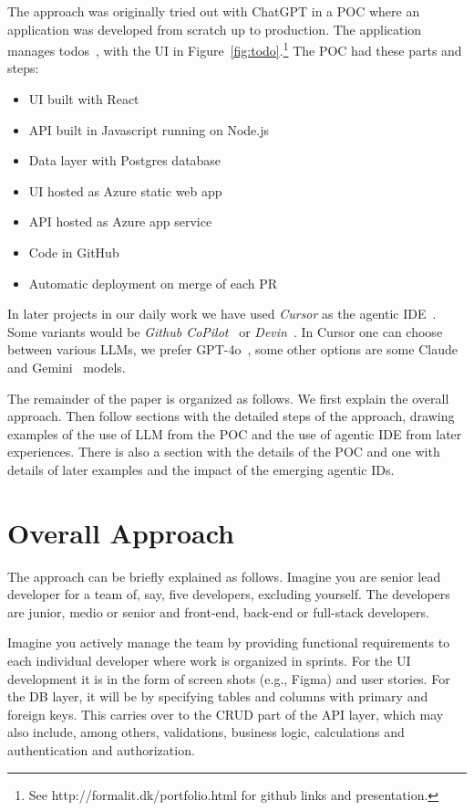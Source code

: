 \documentclass[runningheads]{llncs}
\begin{document}
\noindent The approach was originally tried out with ChatGPT in a POC where an application was developed from scratch up to production. The application manages todos~\cite{Freeman2013}, with the UI in Figure~\ref{fig:todo}.\footnote{See http://formalit.dk/portfolio.html for github links and presentation.}  The POC had these parts and steps:
\begin{itemize}
    \item UI built with React
    \item API built in Javascript running on Node.js
    \item Data layer with Postgres database
    \item UI hosted as Azure static web app
    \item API hosted as Azure app service
    \item Code in GitHub
    \item Automatic deployment on merge of each PR
\end{itemize}

\noindent In later projects in our daily work we have used {\em Cursor} as the agentic IDE~\cite{Cursor2023}. Some variants would be {\em Github CoPilot}~\cite{GitHubCopilot2023} or {\em Devin}~\cite{Devin2023}. In Cursor one can choose between various LLMs, we prefer GPT-4o~\cite{GPT402023}, some other options are some Claude~\cite{Claude2023} and Gemini~\cite{Gemini2023} models.

The remainder of the paper is organized as follows. We first explain the overall approach. Then follow sections with the detailed steps of the approach, drawing examples of the use of LLM from the POC and the use of agentic IDE from later experiences.  There is also a section with the details of the POC and one with details of later examples and the impact of the emerging agentic IDs.

\section{Overall Approach}
The approach can be briefly explained as follows. Imagine you are senior lead developer for a team of, say, five developers, excluding yourself. The developers are junior, medio or senior and front-end, back-end or full-stack developers.

Imagine you actively manage the team by providing functional requirements to each individual developer where work is organized in sprints. For the UI development it is in the form of screen shots (e.g., Figma) and user stories. For the DB layer, it will be by specifying tables and columns with primary and foreign keys. This carries over to the CRUD part of the API layer, which may also include, among others, validations, business logic, calculations and authentication and authorization.
\end{document}
